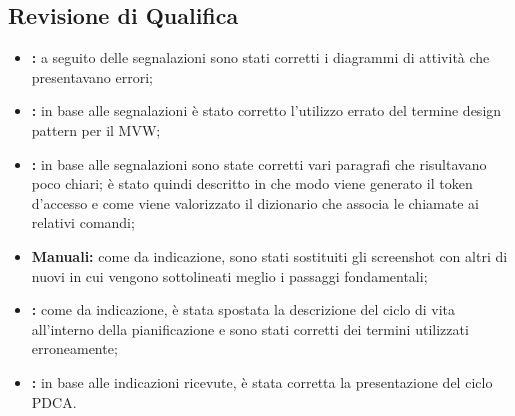 	\subsection{Revisione di Qualifica}
	\begin{itemize}
		\item \textbf{\docNameAdR:} a seguito delle segnalazioni sono stati corretti i diagrammi di attività che presentavano errori;
		\item \textbf{\docNameST:} in base alle segnalazioni è stato corretto l'utilizzo errato del termine design pattern per il MVW;
		\item \textbf{\docNameDdP:} in base alle segnalazioni sono state corretti vari paragrafi che risultavano poco chiari; è stato quindi descritto in che modo viene generato il token d'accesso e come viene valorizzato il dizionario che associa le chiamate ai relativi comandi;
		\item \textbf{Manuali:} come da indicazione, sono stati sostituiti gli screenshot con altri di nuovi in cui vengono sottolineati meglio i passaggi fondamentali;
		\item \textbf{\docNamePdP:} come da indicazione, è stata spostata la descrizione del ciclo di vita all'interno della pianificazione e sono stati corretti dei termini utilizzati erroneamente;
		\item \textbf{\docNamePdQ:} in base alle indicazioni ricevute, è stata corretta la presentazione del ciclo PDCA. 
	\end{itemize}

\pagebreak